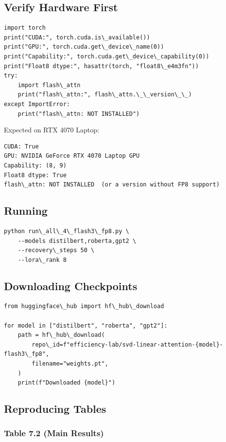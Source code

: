 \subsection{Verify Hardware First}

\begin{lstlisting}
import torch
print("CUDA:", torch.cuda.is\_available())
print("GPU:", torch.cuda.get\_device\_name(0))
print("Capability:", torch.cuda.get\_device\_capability(0))
print("Float8 dtype:", hasattr(torch, "float8\_e4m3fn"))
try:
    import flash\_attn
    print("flash\_attn:", flash\_attn.\_\_version\_\_)
except ImportError:
    print("flash\_attn: NOT INSTALLED")
\end{lstlisting}

Expected on RTX 4070 Laptop:

\begin{lstlisting}
CUDA: True
GPU: NVIDIA GeForce RTX 4070 Laptop GPU
Capability: (8, 9)
Float8 dtype: True
flash\_attn: NOT INSTALLED  (or a version without FP8 support)
\end{lstlisting}

\subsection{Running}

\begin{lstlisting}
python run\_all\_4\_flash3\_fp8.py \
    --models distilbert,roberta,gpt2 \
    --recovery\_steps 50 \
    --lora\_rank 8
\end{lstlisting}

\subsection{Downloading Checkpoints}

\begin{lstlisting}
from huggingface\_hub import hf\_hub\_download

for model in ["distilbert", "roberta", "gpt2"]:
    path = hf\_hub\_download(
        repo\_id=f"efficiency-lab/svd-linear-attention-{model}-flash3\_fp8",
        filename="weights.pt",
    )
    print(f"Downloaded {model}")
\end{lstlisting}

\subsection{Reproducing Tables}

\subsubsection{Table 7.2 (Main Results)}

